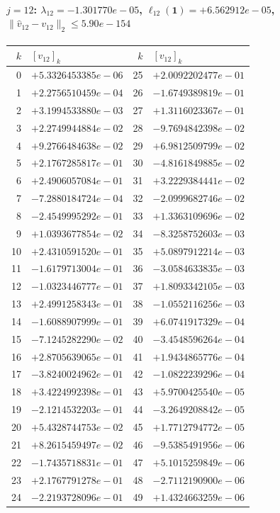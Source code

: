 \documentclass[11pt]{article}
\begin{document}
\paragraph{$j = 12$: $\lambda_{12} = -1.301770e-05$, \quad $\ell_{12}(\mathbf{1}) = +6.562912e-05$, \quad $\|\hat{v}_{12} - v_{12}\|_2 \leq 5.90e-154$}
\begin{center}
{\footnotesize
\begin{tabular}{r@{\;\;}l@{\quad}r@{\;\;}l}
\toprule
$k$ & $[v_{12}]_k$ & $k$ & $[v_{12}]_k$ \\
\midrule
0 & $+5.3326453385e-06$ & 25 & $+2.0092202477e-01$ \\
1 & $+2.2756510459e-04$ & 26 & $-1.6749389819e-01$ \\
2 & $+3.1994533880e-03$ & 27 & $+1.3116023367e-01$ \\
3 & $+2.2749944884e-02$ & 28 & $-9.7694842398e-02$ \\
4 & $+9.2766484638e-02$ & 29 & $+6.9812509799e-02$ \\
5 & $+2.1767285817e-01$ & 30 & $-4.8161849885e-02$ \\
6 & $+2.4906057084e-01$ & 31 & $+3.2229384441e-02$ \\
7 & $-7.2880184724e-04$ & 32 & $-2.0999682746e-02$ \\
8 & $-2.4549995292e-01$ & 33 & $+1.3363109696e-02$ \\
9 & $+1.0393677854e-02$ & 34 & $-8.3258752603e-03$ \\
10 & $+2.4310591520e-01$ & 35 & $+5.0897912214e-03$ \\
11 & $-1.6179713004e-01$ & 36 & $-3.0584633835e-03$ \\
12 & $-1.0323446777e-01$ & 37 & $+1.8093342105e-03$ \\
13 & $+2.4991258343e-01$ & 38 & $-1.0552116256e-03$ \\
14 & $-1.6088907999e-01$ & 39 & $+6.0741917329e-04$ \\
15 & $-7.1245282290e-02$ & 40 & $-3.4548596264e-04$ \\
16 & $+2.8705639065e-01$ & 41 & $+1.9434865776e-04$ \\
17 & $-3.8240024962e-01$ & 42 & $-1.0822239296e-04$ \\
18 & $+3.4224992398e-01$ & 43 & $+5.9700425540e-05$ \\
19 & $-2.1214532203e-01$ & 44 & $-3.2649208842e-05$ \\
20 & $+5.4328744753e-02$ & 45 & $+1.7712794772e-05$ \\
21 & $+8.2615459497e-02$ & 46 & $-9.5385491956e-06$ \\
22 & $-1.7435718831e-01$ & 47 & $+5.1015259849e-06$ \\
23 & $+2.1767791278e-01$ & 48 & $-2.7112190900e-06$ \\
24 & $-2.2193728096e-01$ & 49 & $+1.4324663259e-06$ \\
\bottomrule
\end{tabular}
}
\end{center}
\end{document}
